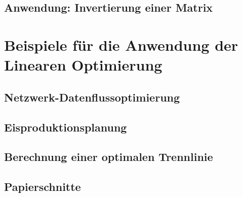\documentclass{scrartcl}
\begin{document}
\subsection{Anwendung: Invertierung einer Matrix}



\section{Beispiele für die Anwendung der Linearen Optimierung}

\subsection{Netzwerk-Datenflussoptimierung}

\subsection{Eisproduktionsplanung}

\subsection{Berechnung einer optimalen Trennlinie}

\subsection{Papierschnitte}

\end{document}
